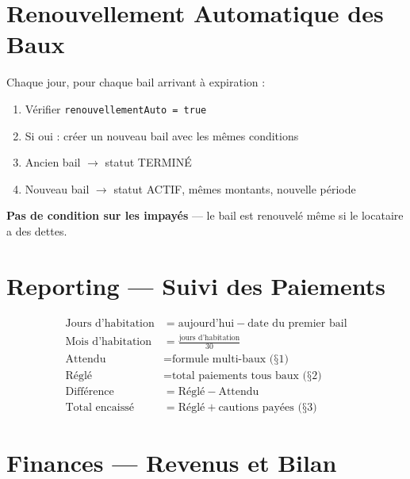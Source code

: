 \documentclass[a4paper,12pt]{article}
\begin{document}
\section{Renouvellement Automatique des Baux}

\begin{formulebox}
Chaque jour, pour chaque bail arrivant à expiration :
\begin{enumerate}[noitemsep]
  \item Vérifier \texttt{renouvellementAuto = true}
  \item Si oui : créer un nouveau bail avec les mêmes conditions
  \item Ancien bail $\rightarrow$ statut TERMINÉ
  \item Nouveau bail $\rightarrow$ statut ACTIF, mêmes montants, nouvelle période
\end{enumerate}
\textbf{Pas de condition sur les impayés} — le bail est renouvelé même si le locataire a des dettes.
\end{formulebox}

\section{Reporting — Suivi des Paiements}

\begin{formulebox}
\begin{align}
\text{Jours d'habitation} &= \text{aujourd'hui} - \text{date du premier bail} \\
\text{Mois d'habitation} &= \frac{\text{jours d'habitation}}{30} \\
\text{Attendu} &= \text{formule multi-baux (§1)} \\
\text{Réglé} &= \text{total paiements tous baux (§2)} \\
\text{Différence} &= \text{Réglé} - \text{Attendu} \\
\text{Total encaissé} &= \text{Réglé} + \text{cautions payées (§3)}
\end{align}
\end{formulebox}

\section{Finances — Revenus et Bilan}
\end{document}
